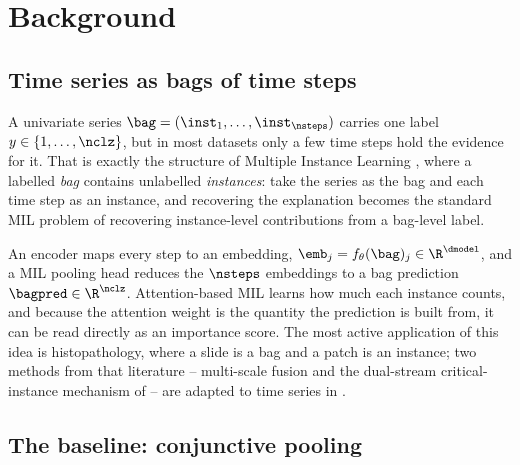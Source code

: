 %

\section{Background}
\label{sec:bg}

\subsection{Time series as bags of time steps}
\label{sec:bg:mil}

A univariate series $\bag = (\inst_1, \dots, \inst_{\nsteps})$ carries one label
$y \in \{1,\dots,\nclz\}$, but in most datasets only a few time steps hold the evidence for it. That
is exactly the structure of Multiple Instance Learning \citep{dietterich1997mil}, where a labelled
\emph{bag} contains unlabelled \emph{instances}: take the series as the bag and each time step as an
instance, and recovering the explanation becomes the standard MIL problem of recovering
instance-level contributions from a bag-level label.

An encoder maps every step to an embedding, $\emb_j = f_\theta(\bag)_j \in \R^{\dmodel}$, and a MIL
pooling head reduces the $\nsteps$ embeddings to a bag prediction $\bagpred \in \R^{\nclz}$.
Attention-based MIL \citep{ilse2018attention} learns how much each instance counts, and because the
attention weight is the quantity the prediction is built from, it can be read directly as an
importance score. The most active application of this idea is histopathology, where a slide is a bag
and a patch is an instance; two methods from that literature -- multi-scale fusion
\citep{hashimoto2020msdamil} and the dual-stream critical-instance mechanism of
\citet{li2021dsmil} -- are adapted to time series in .

\subsection{The baseline: conjunctive pooling}
\label{sec:bg:conj}

